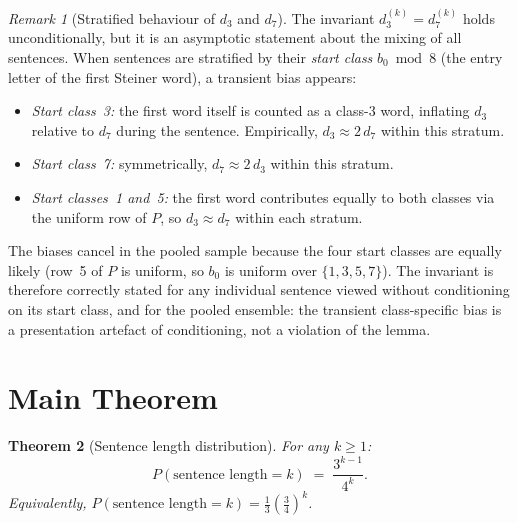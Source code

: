 \documentclass[12pt]{article}
\newtheorem{theorem}{Theorem}[section]
\theoremstyle{definition}
\theoremstyle{remark}
\newtheorem{remark}[theorem]{Remark}
\begin{document}
\begin{remark}[Stratified behaviour of $d_3$ and $d_7$]
\label{rem:stratified-d3-d7}
The invariant $d_3^{(k)} = d_7^{(k)}$ holds unconditionally, but it is an
asymptotic statement about the mixing of all sentences.
When sentences are stratified by their \emph{start class} $b_0 \bmod 8$
(the entry letter of the first Steiner word), a transient bias appears:

\begin{itemize}
  \item \emph{Start class~3:} the first word itself is counted as a class-3
        word, inflating $d_3$ relative to $d_7$ during the sentence.
        Empirically, $d_3 \approx 2\,d_7$ within this stratum.
  \item \emph{Start class~7:} symmetrically, $d_7 \approx 2\,d_3$ within
        this stratum.
  \item \emph{Start classes~1 and~5:} the first word contributes equally to
        both classes via the uniform row of $P$, so $d_3 \approx d_7$ within
        each stratum.
\end{itemize}

The biases cancel in the pooled sample because the four start classes are
equally likely (row~5 of $P$ is uniform, so $b_0$ is uniform over
$\{1,3,5,7\}$). The invariant is therefore correctly stated for any
individual sentence viewed without conditioning on its start class, and
for the pooled ensemble: the transient class-specific bias is a
presentation artefact of conditioning, not a violation of the lemma.
\end{remark}

\section{Main Theorem}
\label{sec:main}

\begin{theorem}[Sentence length distribution]
\label{thm:main}
For any $k \geq 1$:
\[
  P(\text{sentence length} = k) \;=\; \frac{3^{k-1}}{4^k}.
\]
Equivalently, $P(\text{sentence length} = k) = \frac{1}{3}\left(\frac{3}{4}\right)^k$.
\end{theorem}
\end{document}
